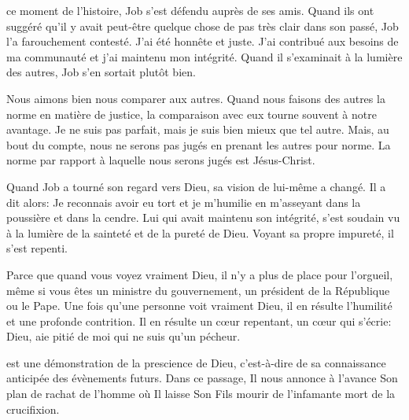 ce moment de l'histoire,
 Job s'est défendu auprès de ses amis.
 Quand ils ont suggéré qu'il y avait peut-être quelque chose
 de pas très clair dans son passé, Job l'a farouchement contesté.
 \og J'ai été honnête et juste. J'ai contribué aux besoins de ma communauté
 et j'ai maintenu mon intégrité. \fg{}
 Quand il s'examinait à la lumière des autres, Job s'en sortait plutôt bien.

Nous aimons bien nous comparer aux autres.
 Quand nous faisons des autres la norme en matière de justice,
 la comparaison avec eux tourne souvent à notre avantage.
 \og Je ne suis pas parfait, mais je suis bien mieux que tel autre. \fg{}
 Mais, au bout du compte, nous ne serons pas jugés en prenant
 les autres pour norme.
 La norme par rapport à laquelle nous serons jugés est Jésus-Christ.

Quand Job a tourné son regard vers Dieu, sa vision de lui-même a changé.
 Il a dit alors\space: \og Je reconnais avoir eu tort et je m'humilie en m'asseyant
 dans la poussière et dans la cendre. \fg{}
 Lui qui avait maintenu son intégrité, s'est soudain vu à la lumière
 de la sainteté et de la pureté de Dieu.
 Voyant sa propre impureté, il s'est repenti.


Parce que quand vous voyez vraiment Dieu,
 il n'y a plus de place pour l'orgueil,
 même si vous êtes un ministre du gouvernement,
 un président de la République ou le Pape.
 Une fois qu'une personne voit vraiment Dieu,
 il en résulte l'humilité et une profonde contrition.
 Il en résulte un cœur repentant,
 un cœur qui s'écrie\space:
 \og Dieu, aie pitié de moi qui ne suis qu'un pécheur. \fg{}

\dvrule






 est une démonstration
 de la prescience de Dieu, c'est-à-dire de sa connaissance anticipée
 des évènements futurs.
 Dans ce passage, Il nous annonce à l'avance Son plan de rachat
 de l'homme où Il laisse Son Fils mourir de l'infamante mort de la crucifixion.

